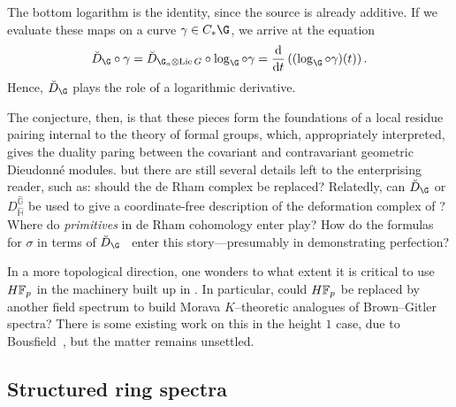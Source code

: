 \begin{enumerate}
    \begin{center}
    \end{center}
    The bottom logarithm is the identity, since the source is already additive.  If we evaluate these maps on a curve \(\gamma \in C_* \G\), we arrive at the equation~\cite[V.8.5]{LazardCFGs} \[\breve D_{\G} \circ \gamma = \breve D_{\G_a \otimes \Lie G} \circ \log_{\G} \circ \gamma = \frac{\mathrm d}{\mathrm dt} \left( (\log_\G \circ \gamma)(t) \right).\]  Hence, \(\breve D_{\G}\) plays the role of a logarithmic derivative.
\end{enumerate}

The conjecture, then, is that these pieces form the foundations of a local residue pairing internal to the theory of formal groups, which, appropriately interpreted, gives the duality paring between the covariant and contravariant geometric Dieudonn\'e modules. but there are still several details left to the enterprising reader, such as: should the de Rham complex be replaced?  Relatedly, can \(\breve D_{\G}\) or \(D_{\widehat{\mathbb H}}^{\widehat{\mathbb G}}\) be used to give a coordinate-free description of the deformation complex of ?  Where do \emph{primitives} in de Rham cohomology enter play?  How do the formulas for \(\sigma\) in terms of \(\breve D_{\G}\)~\cite[VII.6.14]{LazardCFGs} enter this story---presumably in demonstrating perfection?

In a more topological direction, one wonders to what extent it is critical to use \(\HFp\) in the machinery built up in .  In particular, could \(\HFp\) be replaced by another field spectrum to build Morava \(K\)--theoretic analogues of Brown--Gitler spectra?  There is some existing work on this in the height \(1\) case, due to Bousfield~\cite{BousfieldLambdaRings}, but the matter remains unsettled.





\subsection*{Structured ring spectra}

